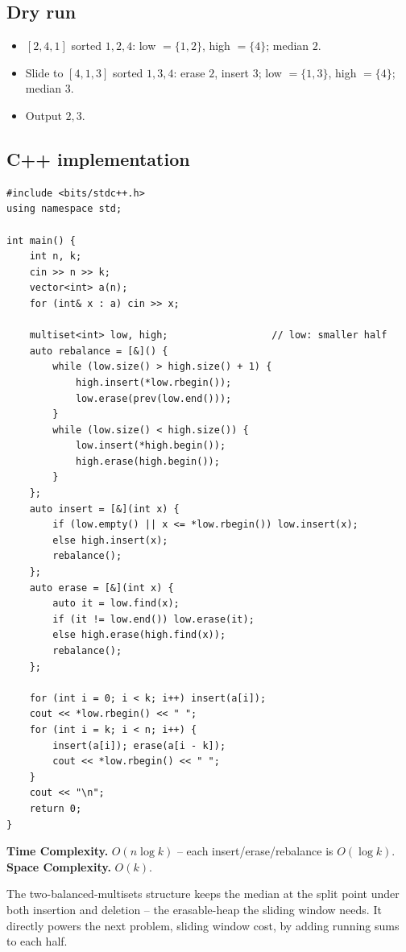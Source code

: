 \subsection*{Dry run}


\begin{itemize}
  \item $[2,4,1]$ sorted $1,2,4$: low $=\{1,2\}$, high $=\{4\}$; median
        $2$.
  \item Slide to $[4,1,3]$ sorted $1,3,4$: erase $2$, insert $3$; low
        $=\{1,3\}$, high $=\{4\}$; median $3$.
  \item Output $2,3$.
\end{itemize}

\subsection*{C++ implementation}

\begin{lstlisting}
#include <bits/stdc++.h>
using namespace std;

int main() {
    int n, k;
    cin >> n >> k;
    vector<int> a(n);
    for (int& x : a) cin >> x;

    multiset<int> low, high;                  // low: smaller half
    auto rebalance = [&]() {
        while (low.size() > high.size() + 1) {
            high.insert(*low.rbegin());
            low.erase(prev(low.end()));
        }
        while (low.size() < high.size()) {
            low.insert(*high.begin());
            high.erase(high.begin());
        }
    };
    auto insert = [&](int x) {
        if (low.empty() || x <= *low.rbegin()) low.insert(x);
        else high.insert(x);
        rebalance();
    };
    auto erase = [&](int x) {
        auto it = low.find(x);
        if (it != low.end()) low.erase(it);
        else high.erase(high.find(x));
        rebalance();
    };

    for (int i = 0; i < k; i++) insert(a[i]);
    cout << *low.rbegin() << " ";
    for (int i = k; i < n; i++) {
        insert(a[i]); erase(a[i - k]);
        cout << *low.rbegin() << " ";
    }
    cout << "\n";
    return 0;
}
\end{lstlisting}

\begin{complexitybox}
\textbf{Time Complexity.} $O(n\log k)$ -- each insert/erase/rebalance is
$O(\log k)$. \textbf{Space Complexity.} $O(k)$.
\end{complexitybox}

\begin{takeawaybox}
The two-balanced-multisets structure keeps the median at the split point
under both insertion and deletion -- the erasable-heap the sliding window
needs. It directly powers the next problem, sliding window cost, by adding
running sums to each half.
\end{takeawaybox}
